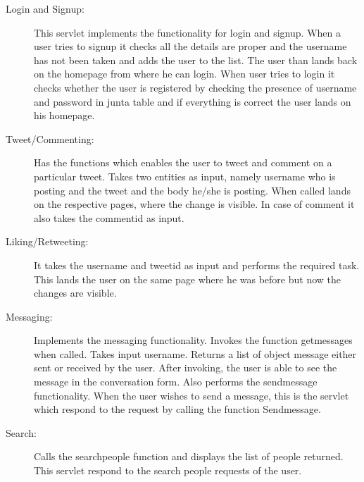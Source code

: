 \documentclass[a4paper]{article}
\begin{document}
\begin{description}
\item[Login and Signup: ]This servlet implements the functionality for login and signup. When a user tries to signup it checks all the details are proper and the username has not been taken and adds the user to the list. The user than lands back on the homepage from where he can login. When user tries to login it checks whether the user is registered by checking the presence of username and password in junta table and if everything is correct the user lands on his homepage.%
\item[Tweet/Commenting: ]Has the functions which enables the user to tweet and comment on a particular tweet. Takes two entities as input, namely username who is posting and the tweet and the body he/she is posting. When called lands on the respective pages, where the change is visible. In case of comment it also takes the commentid as input.

\item[Liking/Retweeting: ]It takes the username and tweetid as input and performs the required task. This lands the user on the same page where he was before but now the changes are visible.

\item[Messaging: ]Implements the messaging functionality. Invokes the function getmessages when called. Takes input username. Returns a list of object message either sent or received by the user. After invoking, the user is able to see the message in the conversation form. Also performs the sendmessage functionality. When the user wishes to send a message, this is the servlet which respond to the request by calling the function Sendmessage.
\item[Search: ]Calls the searchpeople function and displays the list of people returned. This servlet respond to the search people requests of the user.


\end{description}
\end{document}
